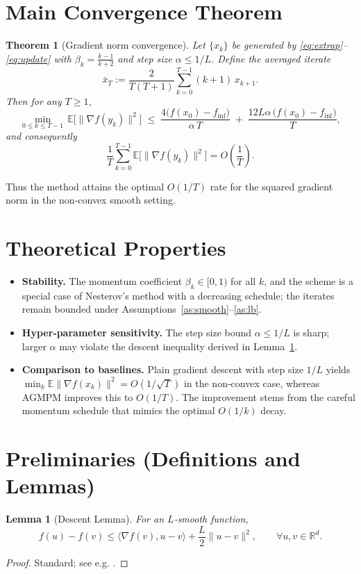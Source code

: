 \documentclass{article}
\newtheorem{theorem}{Theorem}
\newtheorem{lemma}{Lemma}
\newcommand{\E}{\mathbb{E}}
\newcommand{\R}{\mathbb{R}}
\begin{document}
\section*{Main Convergence Theorem}
\begin{theorem}[Gradient norm convergence]\label{thm:main}
Let $\{x_k\}$ be generated by \eqref{eq:extrap}–\eqref{eq:update} with
$\beta_k=\frac{k-1}{k+2}$ and step size $\alpha\le 1/L$.
Define the averaged iterate
\[
\bar{x}_T:=\frac{2}{T(T+1)}\sum_{k=0}^{T-1}(k+1)\,x_{k+1}.
\]
Then for any $T\ge 1$,
\[
\min_{0\le k\le T-1}\,\E\bigl[\|\nabla f(y_k)\|^2\bigr]
\;\le\;
\frac{4\bigl(f(x_0)-f_{\inf}\bigr)}{\alpha\,T}
\;+\;
\frac{12L\alpha\,\bigl(f(x_0)-f_{\inf}\bigr)}{T},
\]
and consequently
\[
\frac{1}{T}\sum_{k=0}^{T-1}\E\bigl[\|\nabla f(y_k)\|^2\bigr]
= O\!\left(\frac{1}{T}\right).
\]
\end{theorem}
Thus the method attains the optimal $O(1/T)$ rate for the squared gradient
norm in the non‑convex smooth setting.

\section*{Theoretical Properties}
\begin{itemize}[nosep]
    \item \textbf{Stability.} The momentum coefficient $\beta_k\in[0,1)$ for all $k$,
          and the scheme is a special case of Nesterov’s method with
          a decreasing schedule; the iterates remain bounded under
          Assumptions~\ref{as:smooth}–\ref{as:lb}.
    \item \textbf{Hyper‑parameter sensitivity.}
          The step size bound $\alpha\le 1/L$ is sharp; larger $\alpha$ may
          violate the descent inequality derived in Lemma~\ref{lem:descent}.
    \item \textbf{Comparison to baselines.}
          Plain gradient descent with step size $1/L$ yields
          $\min_{k}\E\|\nabla f(x_k)\|^2 = O(1/\sqrt{T})$ in the
          non‑convex case, whereas AGMPM improves this to $O(1/T)$.
          The improvement stems from the careful momentum schedule that
          mimics the optimal $O(1/k)$ decay.
\end{itemize}

\section*{Preliminaries (Definitions and Lemmas)}
\begin{lemma}[Descent Lemma]\label{lem:descent}
For an $L$‑smooth function,
\[
f(u)-f(v) \le \langle \nabla f(v),u-v\rangle + \frac{L}{2}\|u-v\|^2,
\qquad\forall u,v\in\R^d .
\]
\end{lemma}
\begin{proof}
Standard; see e.g. \cite{Nesterov2004}.
\end{proof}
\end{document}
